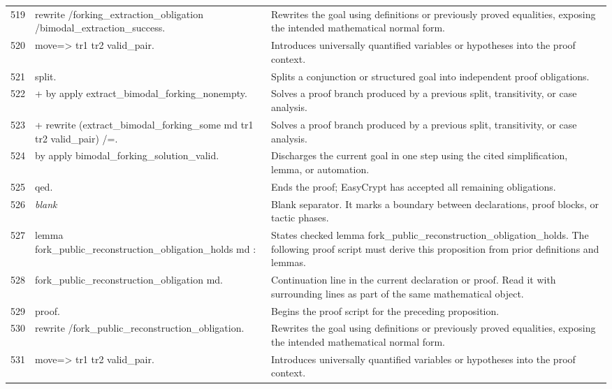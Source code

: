 \documentclass[10pt]{article}
\begin{document}
\begin{longtable}{r L{0.53\textwidth} L{0.37\textwidth}}
519 & {\ttfamily\scriptsize rewrite /forking\_extraction\_obligation /bimodal\_extraction\_success.} & Rewrites the goal using definitions or previously proved equalities, exposing the intended mathematical normal form. \\
520 & {\ttfamily\scriptsize move=> tr1 tr2 valid\_pair.} & Introduces universally quantified variables or hypotheses into the proof context. \\
521 & {\ttfamily\scriptsize split.} & Splits a conjunction or structured goal into independent proof obligations. \\
522 & {\ttfamily\scriptsize + by apply extract\_bimodal\_forking\_nonempty.} & Solves a proof branch produced by a previous split, transitivity, or case analysis. \\
523 & {\ttfamily\scriptsize + rewrite (extract\_bimodal\_forking\_some md tr1 tr2 valid\_pair) /=.} & Solves a proof branch produced by a previous split, transitivity, or case analysis. \\
524 & {\ttfamily\scriptsize   by apply bimodal\_forking\_solution\_valid.} & Discharges the current goal in one step using the cited simplification, lemma, or automation. \\
525 & {\ttfamily\scriptsize qed.} & Ends the proof; EasyCrypt has accepted all remaining obligations. \\
526 & {\ttfamily\scriptsize \emph{blank}} & Blank separator.  It marks a boundary between declarations, proof blocks, or tactic phases. \\
527 & {\ttfamily\scriptsize lemma fork\_public\_reconstruction\_obligation\_holds md :} & States checked lemma fork\_public\_reconstruction\_obligation\_holds.  The following proof script must derive this proposition from prior definitions and lemmas. \\
528 & {\ttfamily\scriptsize   fork\_public\_reconstruction\_obligation md.} & Continuation line in the current declaration or proof.  Read it with surrounding lines as part of the same mathematical object. \\
529 & {\ttfamily\scriptsize proof.} & Begins the proof script for the preceding proposition. \\
530 & {\ttfamily\scriptsize rewrite /fork\_public\_reconstruction\_obligation.} & Rewrites the goal using definitions or previously proved equalities, exposing the intended mathematical normal form. \\
531 & {\ttfamily\scriptsize move=> tr1 tr2 valid\_pair.} & Introduces universally quantified variables or hypotheses into the proof context. \\

\end{longtable}
\end{document}
